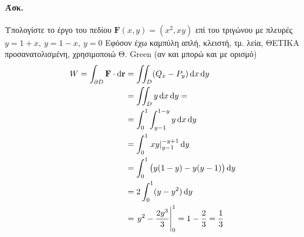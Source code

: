 \documentclass[11pt,a4paper,titlepage,draft]{article}
\begin{document}
\paragraph{Άσκ.}
Υπολογίστε το έργο του πεδίου \( \mathbf F(x,y) = (x^2,xy) \) επί του τριγώνου με πλευρές \( y=1+x,\ y=1-x,\ y=0 \)
Εφόσον έχω καμπύλη απλή, κλειστή, τμ. λεία, ΘΕΤΙΚΑ προσανατολισμένη, χρησιμοποιώ Θ. \textlatin{Green} (αν και μπορώ και με ορισμό)
\begin{align*}
W = \int_{\partial D} \mathbf F \cdot \dif \mathbf r &= \iint_D (Q_x-P_y)\dif x\dif y
\\ &=\iint_D y\dif x \dif y = 
\\ &= \int_0^1 \int_{y-1}^{1-y} y\dif x\dif y
\\ &= \int_0^1 \left. xy\right|_{y-1}^{-y+1} \dif y
\\ &= \int_0^1 \left(y(1-y)-y(y-1)\right)\dif y
\\ &= 2\int_0^1(y-y^2)\dif y
\\ &= \left. y^2 - \frac{2y^3}{3} \right|_0^1 = 1-\frac{2}{3} = \frac{1}{3}
\end{align*}
\end{document}
